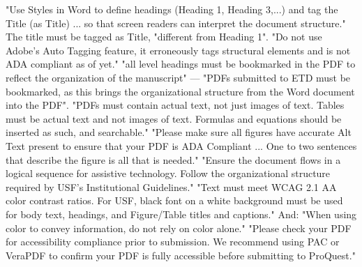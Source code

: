 %
%
\thesisrequiretagging
{}
	{"Use Styles in Word to define headings (Heading 1, Heading 3,...) and tag
	 the Title (as Title) ... so that screen readers can interpret the document
	 structure." The title must be tagged as Title, "different from Heading 1".
	 "Do not use Adobe's Auto Tagging feature, it erroneously tags structural
	 elements and is not ADA compliant as of yet."}
	{"all level headings must be bookmarked in the PDF to reflect the
	 organization of the manuscript" — "PDFs submitted to ETD must be
	 bookmarked, as this brings the organizational structure from the Word
	 document into the PDF".}
	{"PDFs must contain actual text, not just images of text. Tables must be
	 actual text and not images of text. Formulas and equations should be
	 inserted as such, and searchable."}
	{"Please make sure all figures have accurate Alt Text present to ensure that
	 your PDF is ADA Compliant ... One to two sentences that describe the figure
	 is all that is needed."}
	{"Ensure the document flows in a logical sequence for assistive technology.
	 Follow the organizational structure required by USF's Institutional
	 Guidelines."}
	{"Text must meet WCAG 2.1 AA color contrast ratios. For USF, black font on a
	 white background must be used for body text, headings, and Figure/Table
	 titles and captions." And: "When using color to convey information, do not
	 rely on color alone."}
	{"Please check your PDF for accessibility compliance prior to submission. We
	 recommend using PAC or VeraPDF to confirm your PDF is fully accessible
	 before submitting to ProQuest."}

